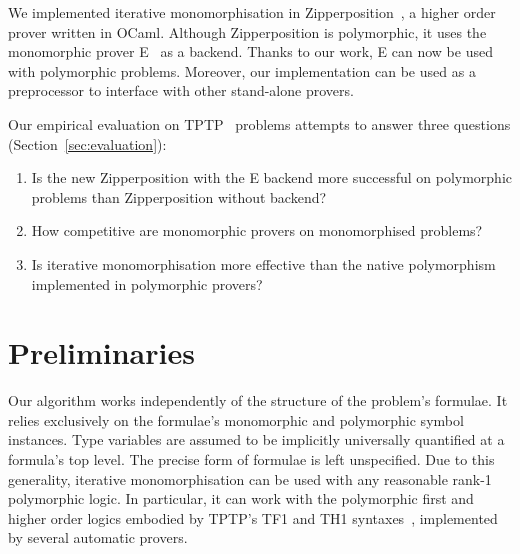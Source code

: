 \documentclass[runningheads]{llncs}
\begin{document}
We implemented iterative monomorphisation in Zipperposition~\cite{vukmirovic-et-al-2021}, a higher order prover written in OCaml. Although Zipperposition is polymorphic, it uses the monomorphic prover E~\cite{e} as a backend. Thanks to our work, E can now be used with polymorphic problems. Moreover, our implementation can be used as a preprocessor to interface with other stand-alone provers.

Our empirical evaluation on TPTP~\cite{tptp} problems attempts to answer three questions (Section~\ref{sec:evaluation}):
\begin{enumerate}
\item Is the new Zipperposition with the E backend more successful on polymorphic problems than Zipperposition without backend?

\item How competitive are monomorphic provers on monomorphised %
problems?

\item Is iterative monomorphisation more effective than the native polymorphism implemented in polymorphic provers?
\end{enumerate}

%
%

\section{Preliminaries}
\label{sec:preliminaries}

Our algorithm works independently of the structure of the problem's formulae. It relies exclusively on the formulae's monomorphic and polymorphic symbol instances. Type variables are assumed to be implicitly universally quantified at a formula's top level. The precise form of formulae is left unspecified.
Due to this generality, iterative monomorphisation can be used with any reasonable rank-1 polymorphic logic. In particular, it can work with the polymorphic first and higher order logics embodied by TPTP's TF1 and TH1 syntaxes~\cite{blanchette-paskevich-2013,th1}, implemented by several automatic provers.
\end{document}
